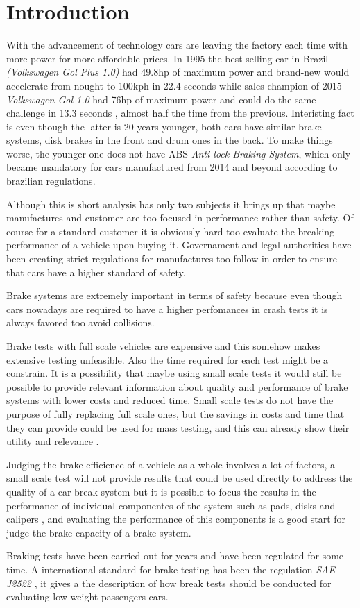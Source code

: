 \chapter{Introduction}

With the advancement of technology cars are leaving the factory each time with more power for more affordable prices. In 1995 the best-selling car in Brazil \cite{lideres-vendas-brasil} \textit{(Volkswagen Gol Plus 1.0)} had 49.8hp of maximum power and brand-new would accelerate from nought to 100kph in 22.4 seconds \cite{cnwgol1993} while sales champion of 2015 \textit{Volkswagen Gol 1.0} had 76hp of maximum power and could do the same challenge in 13.3 seconds \cite{cnwgol2013}, almost half the time from the previous. Interisting fact is even though the latter is 20 years younger, both cars have similar brake systems, disk brakes in the front and drum ones in the back. To make things worse, the younger one does not have ABS \textit{Anti-lock Braking System}, which only became mandatory for cars manufactured from 2014 and beyond according to brazilian regulations.
\par
Although this is short analysis has only two subjects it brings up that maybe manufactures and customer are too focused in performance rather than safety. Of course for a standard customer it is obviously hard too evaluate the breaking performance of a vehicle upon buying it. Governament and legal authorities have been creating strict regulations for manufactures too follow in order to ensure that cars have a higher standard of safety.
\par
Brake systems are extremely important in terms of safety because even though cars nowadays are required to have a higher perfomances in crash tests it is always favored too avoid collisions.
\par
Brake tests with full scale vehicles are expensive and this somehow makes extensive testing unfeasible. Also the time required for each test might be a constrain. It is a possibility that maybe using small scale tests it would still be possible to provide relevant information about quality and performance of brake systems with lower costs and reduced time. Small scale tests do not have the purpose of fully replacing full scale ones, but the savings in costs and time that they can provide could be used for mass testing, and this can already show their utility and relevance \cite{gardinalli2005comparaccao}. 
\par
Judging the brake efficience of a vehicle as a whole involves a lot of factors, a small scale test will not provide results that could be used directly to address the quality of a car break system but it is possible to focus the results in the performance of individual componentes of the system such as pads, disks and calipers \cite{halderman2016automotive}, and evaluating the performance of this components is a good start for judge the brake capacity of a brake system.
\par
Braking tests have been carried out for years and have been regulated for some time. A international standard for brake testing has been the regulation \textit{SAE J2522} \cite{sae}, it gives a the description of how break tests should be conducted for evaluating low weight passengers cars.


